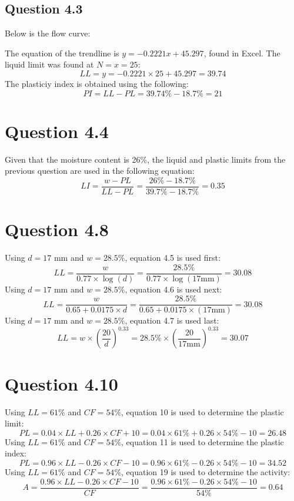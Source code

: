 \documentclass{article}
\begin{document}
\subsection*{Question 4.3}
Below is the flow curve:
\begin{center}
\end{center}
The equation of the trendline is $y=-0.2221x+45.297$, found in Excel. The liquid limit was found at $N=x=25$:
\[LL=y=-0.2221\times 25+45.297=\boxed{39.74}\] 
The plasticiy index is obtained using the following: 
\[PI=LL-PL=39.74\%-18.7\%=\boxed{21}\]
\section*{Question 4.4} 
Given that the moisture content is 26\%, the liquid and plastic limits from the previous question are used in the following equation: 
\[LI=\frac{w-PL}{LL-PL}=\frac{26\%-18.7\%}{39.7\%-18.7\%}=\boxed{0.35}\]
\section*{Question 4.8} 
Using $d=17\text{ mm}$ and $w=28.5\%$, equation 4.5 is used first: 
\[LL=\frac{w}{0.77\times\log(d)}=\frac{28.5\%}{0.77\times\log(17\text {mm})}=\boxed{30.08}\]
Using $d=17\text{ mm}$ and $w=28.5\%$, equation 4.6 is used next: 
\[LL=\frac{w}{0.65+0.0175\times d}=\frac{28.5\%}{0.65+0.0175\times (17\text {mm})}=\boxed{30.08}\]
Using $d=17\text{ mm}$ and $w=28.5\%$, equation 4.7 is used last: 
\[LL=w\times\left(\frac{20}{d}\right)^{0.33}=28.5\%\times\left(\frac{20}{17\text {mm}}\right)^{0.33}=\boxed{30.07}\]
\section*{Question 4.10} 
Using $LL=61\%$ and $CF=54\%$, equation 10 is used to determine the plastic limit: 
\[PL =0.04\times LL+0.26\times CF+10=0.04\times 61\%+0.26\times54\%-10=\boxed{26.48}\]
Using $LL=61\%$ and $CF=54\%$, equation 11 is used to determine the plastic index: 
\[PL =0.96\times LL-0.26\times CF-10=0.96\times 61\%-0.26\times54\%-10=\boxed{34.52}\]
Using $LL=61\%$ and $CF=54\%$, equation 19 is used to determine the activity: 
\[A=\frac{0.96\times LL-0.26\times CF-10}{CF}=\frac{0.96\times 61\%-0.26\times 54\%-10}{54\%}=\boxed{0.64}\]
\end{document}
